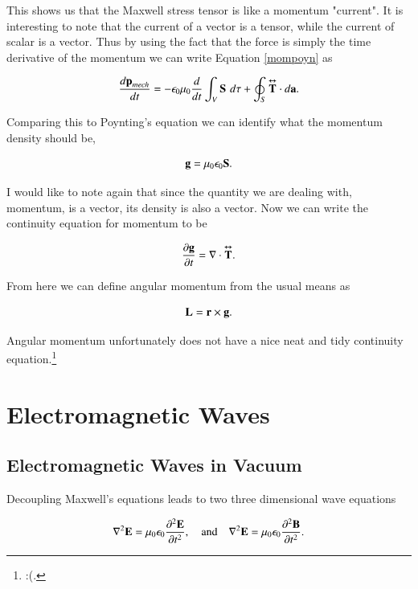 \documentclass[preprint, review,12pt]{elsarticle}
\def\x{\times}
\def\.{\cdot}
\def\b{\textbf}
\def\div{\nabla \.}
\def\lap{\nabla^2}
\def\and{\quad \text{and} \quad}
\newcommand{\pd}[2]{\frac{\partial #1 }{\partial #2}}
\newcommand{\pds}[2]{\frac{\partial^2 #1 }{\partial {#2}^2}}
\newcommand{\td}[2]{\frac{d #1 }{d #2}}
\newcommand{\tup}[1]{\overset{\text{\tiny $\bm\leftrightarrow $}}{\b #1}}
\begin{document}
This shows us that the Maxwell stress tensor is like a momentum "current". It is interesting to note that the current of a vector is a tensor, while the current of scalar is a vector. Thus by using the fact that the force is simply the time derivative of the momentum we can write Equation \ref{mompoyn} as 

\begin{equation}
    \td{\b p_{mech}}{t} = -\epsilon_0 \mu_0 \td{}{t}\int_V \b S \hspace{3.5pt} d\tau + \oint_S \tup{T} \. d\b a.
\end{equation}

Comparing this to Poynting's equation we can identify what the momentum density should be,

\begin{equation}
    \b g = \mu_0\epsilon_0 \b S.
\end{equation}

I would like to note again that since the quantity we are dealing with, momentum, is a vector, its density is also a vector. Now we can write the continuity equation for momentum to be

\begin{equation}
    \pd{\b g}{t} = \div \tup{T}.
\end{equation}

From here we can define angular momentum from the usual means as 

\begin{equation}
    \b L = \b r \x \b g.
\end{equation}

Angular momentum unfortunately does not have a nice neat and tidy continuity equation.\footnote{:(.}

\section{Electromagnetic Waves}

\subsection{Electromagnetic Waves in Vacuum}

Decoupling Maxwell's equations leads to two three dimensional wave equations

\begin{equation}
    \lap \b E = \mu_0 \epsilon_0 \pds{\b E}{t}, \and \lap \b E = \mu_0 \epsilon_0 \pds{\b B}{t}.
\end{equation}
\end{document}
